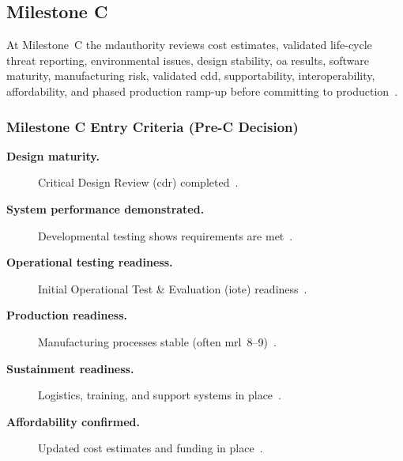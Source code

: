 \documentclass[../main.tex]{subfiles}
\begin{document}
\subsection{Milestone C}
At Milestone~C the \ac{mdauthority} reviews cost estimates, validated life-cycle threat reporting, environmental issues, design stability, \ac{oa} results, software maturity, manufacturing risk, validated \ac{cdd}, supportability, interoperability, affordability, and phased production ramp-up before committing to production~\autocite{DoDI5000-85,DoDI5000-89,edo-3-3-2-acq-milestones-phases-2025}.

\subsubsection{Milestone C Entry Criteria (Pre-C Decision)}
\begin{description}
  \item[\textbf{Design maturity.}] Critical Design Review (\ac{cdr}) completed~\autocite{DoDI5000-85,DoD-EngineeringDefenseSystemsGuidebook-2024,edo-3-3-2-acq-milestones-phases-2025}.
  \item[\textbf{System performance demonstrated.}] Developmental testing shows requirements are met~\autocite{DoDI5000-85,DoDI5000-89,edo-3-3-2-acq-milestones-phases-2025}.
  \item[\textbf{Operational testing readiness.}] Initial Operational Test \& Evaluation (\ac{iote}) readiness~\autocite{DoDI5000-85,DoDI5000-89,edo-3-3-2-acq-milestones-phases-2025}.
  \item[\textbf{Production readiness.}] Manufacturing processes stable (often \ac{mrl}~8--9)~\autocite{DoDI5000-85,DoD-MRL-Deskbook-2025,edo-3-3-2-acq-milestones-phases-2025}.
  \item[\textbf{Sustainment readiness.}] Logistics, training, and support systems in place~\autocite{DoDI5000-85,DoDI5000-91,edo-3-3-2-acq-milestones-phases-2025}.
  \item[\textbf{Affordability confirmed.}] Updated cost estimates and funding in place~\autocite{DoDI5000-85,DoDI5000-73-Cost-Analysis-2024,edo-3-3-2-acq-milestones-phases-2025}.
\end{description}
\end{document}
